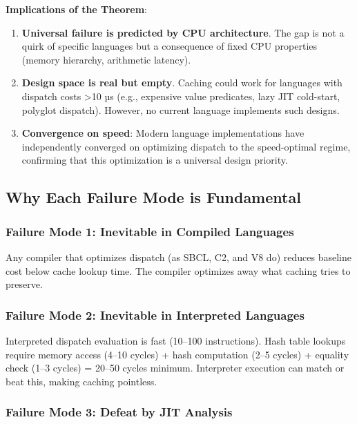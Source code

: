 \documentclass[sigplan,final,acmsmall,review,screen]{acmart}
\begin{document}
\textbf{Implications of the Theorem}:

\begin{enumerate}
  \item \textbf{Universal failure is predicted by CPU architecture}. The gap is not a quirk of specific languages but a consequence of fixed CPU properties (memory hierarchy, arithmetic latency).

  \item \textbf{Design space is real but empty}. Caching could work for languages with dispatch costs >10 µs (e.g., expensive value predicates, lazy JIT cold-start, polyglot dispatch). However, no current language implements such designs.

  \item \textbf{Convergence on speed}: Modern language implementations have independently converged on optimizing dispatch to the speed-optimal regime, confirming that this optimization is a universal design priority.
\end{enumerate}

\subsection{Why Each Failure Mode is Fundamental}

\subsubsection{Failure Mode 1: Inevitable in Compiled Languages}

Any compiler that optimizes dispatch (as SBCL, C2, and V8 do) reduces baseline cost below cache
lookup time. The compiler optimizes away what caching tries to preserve.

\subsubsection{Failure Mode 2: Inevitable in Interpreted Languages}

Interpreted dispatch evaluation is fast (10--100 instructions). Hash table lookups require memory
access (4--10 cycles) + hash computation (2--5 cycles) + equality check (1--3 cycles) = 20--50
cycles minimum. Interpreter execution can match or beat this, making caching pointless.

\subsubsection{Failure Mode 3: Defeat by JIT Analysis}
\end{document}
